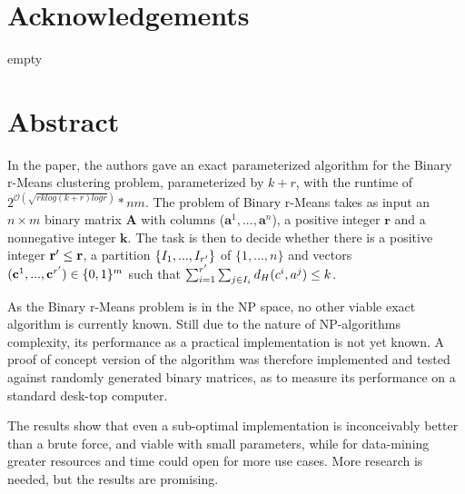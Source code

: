 \documentclass[a4paper]{article}
\begin{document}
%
%


%
%
\section*{Acknowledgements}
empty
\newpage

%
%
\section*{Abstract}
In the \cite{fomin_golovach_panolan_2020} paper, the authors gave an exact parameterized 
algorithm for the Binary r-Means clustering problem, parameterized by $k+r$, with the runtime of 
$2^{\mathcal{O} (\sqrt{rk log(k+r) logr})}*nm$. The problem of Binary r-Means takes as input
an $n \times m$ binary matrix \textbf{A} with columns ($\textbf{a}^1,...,\textbf{a}^n$), a positive 
integer $\textbf{r}$ and a nonnegative integer $\textbf{k}$. 
The task is then to decide whether there is a positive integer $\textbf{r}\sp{\prime} \leq \textbf{r}$, 
a partition $\{I_1, ..., I_{r\sp{\prime}}\}$ of $\{1,...,n\}$ and vectors 
$(\textbf{c}^1,...,\textbf{c}^{r\sp{\prime}}) \in \{0,1\}^m$ such that 
$\sum_{i = 1}^{r\sp{\prime}} \sum_{j \in I_i} d_H(c^i, a^j) \leq k $.

As the Binary r-Means problem is in the NP space, no other viable exact algorithm is currently known. Still due to
the nature of NP-algorithms complexity, its performance as a practical implementation is not yet known. 
A proof of concept version of the algorithm was therefore implemented and tested against randomly generated binary matrices, 
as to measure its performance on a standard desk-top computer. 

The results show that even a sub-optimal implementation is inconceivably better than a brute force, and 
viable with small parameters, while for data-mining greater resources and time could open for more use cases. More 
research is needed, but the results are promising.


\newpage

%
%
\tableofcontents
\newpage

%
%
\listofalgorithms
\newpage
\end{document}
